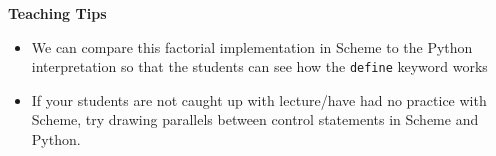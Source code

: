 \begin{blocksection}
\begin{comment}
\begin{lstlisting}
scm> (pair? (cons 1 2))
\end{lstlisting}
\begin{solution}[.25in]
\texttt{\#t}
\end{solution}

\begin{lstlisting}
scm> (list? (cons 1 2))
\end{lstlisting}
\begin{solution}[.25in]
\texttt{\#f}
\end{solution}
\end{comment}
\end{blocksection}

\begin{guide}
\begin{blocksection}
\textbf{Teaching Tips}
\begin{itemize}
  \item We can compare this factorial implementation in Scheme to the Python interpretation so that the students can see how the \lstinline{define} keyword works
  \item If your students are not caught up with lecture/have had no practice with Scheme, try drawing parallels between control statements in Scheme and Python.
\end{itemize}
\end{blocksection}
\end{guide}